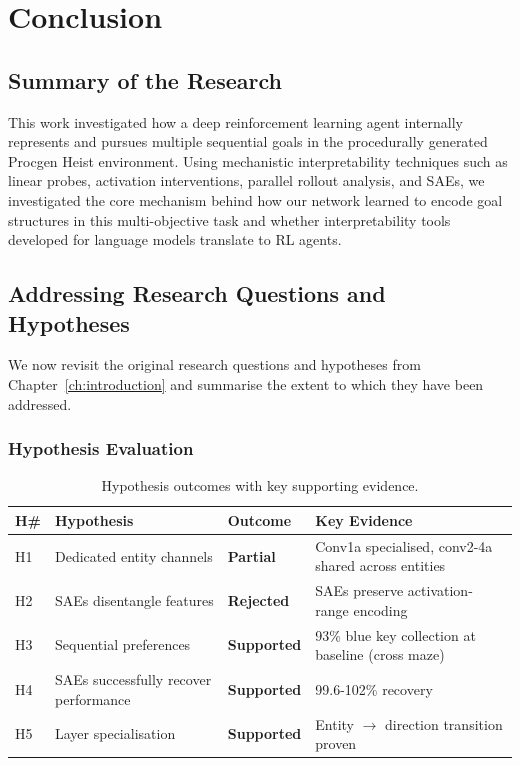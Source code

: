 \chapter{Conclusion}\label{ch:conclusion}

\section{Summary of the Research}\label{sec:research_summary}

This work investigated how a deep reinforcement learning agent internally represents and pursues multiple sequential goals in the procedurally generated Procgen Heist environment. Using mechanistic interpretability techniques such as linear probes, activation interventions, parallel rollout analysis, and SAEs, we investigated the core mechanism behind how our network learned to encode goal structures in this multi-objective task and whether interpretability tools developed for language models translate to RL agents.

\section{Addressing Research Questions and Hypotheses}
\label{sec:addressing_rq}

We now revisit the original research questions and hypotheses from Chapter~\ref{ch:introduction} and summarise the extent to which they have been addressed.

\subsection{Hypothesis Evaluation}

\begin{table}[h]
\centering
\caption[Hypothesis outcomes summary]{Hypothesis outcomes with key supporting evidence.}
\label{tab:hypothesis_outcomes}
\begin{tabular}{p{}p{}p{}p{}}
\toprule
\textbf{H\#} & \textbf{Hypothesis} & \textbf{Outcome} & \textbf{Key Evidence} \\
\midrule
H1 & Dedicated entity channels & \textbf{Partial} & Conv1a specialised, conv2-4a shared across entities \\
H2 & SAEs disentangle features & \textbf{Rejected} & SAEs preserve activation-range encoding \\
H3 & Sequential preferences & \textbf{Supported} & 93\% blue key collection at baseline (cross maze)\\
H4 & SAEs successfully recover performance & \textbf{Supported} & 99.6-102\% recovery \\
H5 & Layer specialisation & \textbf{Supported} & Entity $\rightarrow$ direction transition proven \\
\bottomrule
\end{tabular}
\end{table}

